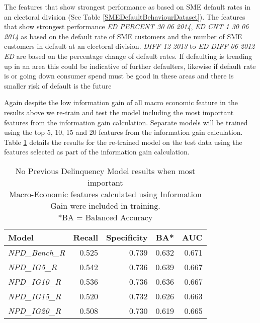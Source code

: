 The features that show strongest performance as based on SME default rates in an electoral division (See Table \ref{SMEDefaultBehaviourDataset}). The features that show strongest performance \textit{ED PERCENT 30 06 2014}, \textit{ED CNT 1 30 06 2014} as based on the default rate of SME customers and the number of SME customers in default at an electoral division. \textit{DIFF 12 2013} to \textit{ED DIFF 06 2012 ED} are based on the percentage change of default rates.  If defaulting is trending up in an area this could be indicative of further defaulters, likewise if default rate is or going down consumer spend must be good in these areas and there is smaller risk of default is the future

Again despite the low information gain of all macro economic feature in the results above we re-train and test the model including the most important features from the information gain calculation. Separate models will be trained using the top 5, 10, 15 and 20 features from the information gain calculation. Table \ref{table:InfoGainNPDModelResults} details the results for the re-trained model on the test data using the features selected as part of the information gain calculation.


\begin{table}[H]
\centering
\small
		\begin{tabular}{l r r r r}
			\hline
			\textbf{Model} & \textbf{Recall} & \textbf{Specificity} & \textbf{BA*} & \textbf{AUC}  \\ \hline
			\textit{NPD\_Bench\_R} & 0.525 & \cellcolor{green!25}0.739 & 0.632 & \cellcolor{green!25}0.671   \\ \hline
			\textit{NPD\_IG5\_R} & \cellcolor{green!25}0.542 & 0.736 & \cellcolor{green!25}0.639 & 0.667   \\ 
			\textit{NPD\_IG10\_R} & 0.536 & 0.736 & 0.636 & 0.667  \\ 
			\textit{NPD\_IG15\_R} & 0.520 & 0.732 & 0.626 & 0.663 \\
			\textit{NPD\_IG20\_R} &  0.508 & 0.730 & 0.619 & 0.665  \\\hline 
		\end{tabular}
	\caption{No Previous Delinquency Model results when most important \\Macro-Economic features calculated using Information Gain were included in training.\\
		*BA = Balanced Accuracy}
	\label{table:InfoGainNPDModelResults}
\end{table}

